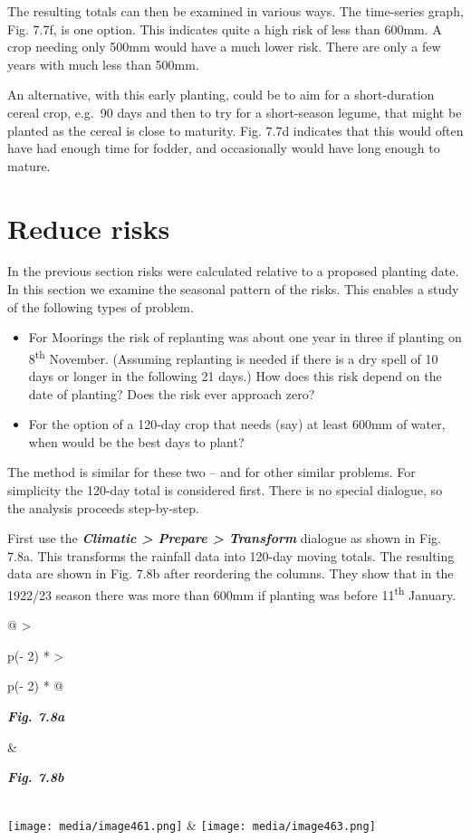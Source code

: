 \documentclass[
  letterpaper,
  DIV=11,
  numbers=noendperiod]{scrreprt}
\begin{document}
The resulting totals can then be examined in various ways. The
time-series graph, Fig. 7.7f, is one option. This indicates quite a high
risk of less than 600mm. A crop needing only 500mm would have a much
lower risk. There are only a few years with much less than 500mm.

An alternative, with this early planting, could be to aim for a
short-duration cereal crop, e.g.~90 days and then to try for a
short-season legume, that might be planted as the cereal is close to
maturity. Fig. 7.7d indicates that this would often have had enough time
for fodder, and occasionally would have long enough to mature.

\section{Reduce risks}\label{reduce-risks}

In the previous section risks were calculated relative to a proposed
planting date. In this section we examine the seasonal pattern of the
risks. This enables a study of the following types of problem.

\begin{itemize}
\item
  For Moorings the risk of replanting was about one year in three if
  planting on 8\textsuperscript{th} November. (Assuming replanting is
  needed if there is a dry spell of 10 days or longer in the following
  21 days.) How does this risk depend on the date of planting? Does the
  risk ever approach zero?
\item
  For the option of a 120-day crop that needs (say) at least 600mm of
  water, when would be the best days to plant?
\end{itemize}

The method is similar for these two -- and for other similar problems.
For simplicity the 120-day total is considered first. There is no
special dialogue, so the analysis proceeds step-by-step.

First use the \textbf{\emph{Climatic \textgreater{} Prepare
\textgreater{} Transform}} dialogue as shown in Fig. 7.8a. This
transforms the rainfall data into 120-day moving totals. The resulting
data are shown in Fig. 7.8b after reordering the columns. They show that
in the 1922/23 season there was more than 600mm if planting was before
11\textsuperscript{th} January.

\begin{longtable}[]{@{}
  >{\raggedright\arraybackslash}p{(\columnwidth - 2\tabcolsep) * }
  >{\raggedright\arraybackslash}p{(\columnwidth - 2\tabcolsep) * }@{}}
\toprule\noalign{}
\begin{minipage}[b]{\linewidth}\raggedright
\textbf{\emph{Fig. 7.8a}}
\end{minipage} & \begin{minipage}[b]{\linewidth}\raggedright
\textbf{\emph{Fig. 7.8b}}
\end{minipage} \\
\midrule\noalign{}
\endhead
\bottomrule\noalign{}
\endlastfoot
\texttt{[image: media/image461.png]} &
\texttt{[image: media/image463.png]} \\
\end{longtable}
\end{document}

